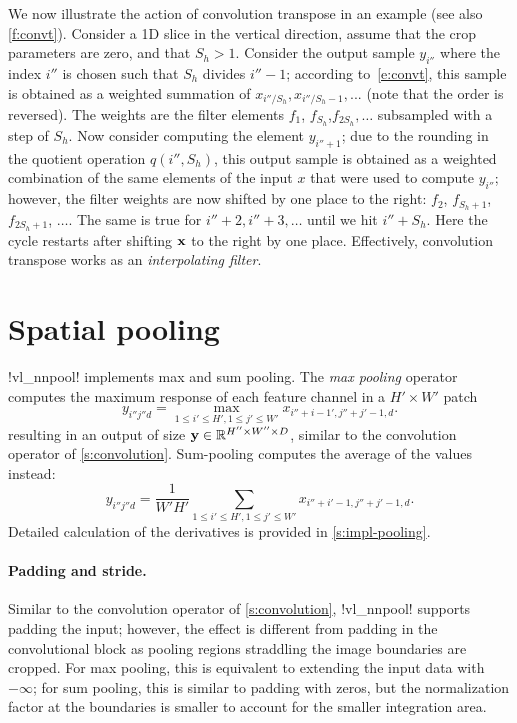 We now illustrate the action of convolution transpose in an example (see also \cref{f:convt}).  Consider a 1D slice in the vertical direction, assume that the crop parameters are zero, and that $S_h>1$. Consider the output sample $y_{i''}$ where the index $i''$ is chosen such that $S_h$ divides $i''-1$; according to~\eqref{e:convt}, this sample is obtained as a weighted summation of $x_{i'' / S_h},x_{i''/S_h-1},...$ (note that the order is reversed). The weights are the filter elements $f_1$, $f_{S_h}$,$f_{2S_h},\dots$ subsampled with a step of $S_h$. Now consider computing the element $y_{i''+1}$; due to the rounding in the quotient operation $q(i'',S_h)$, this output sample is obtained as a weighted combination of the same elements of the input $x$ that were used to compute $y_{i''}$; however, the filter weights are now shifted by one place to the right: $f_2$, $f_{S_h+1}$,$f_{2S_h+1}$, $\dots$. The same is true for $i''+2, i'' + 3,\dots$ until we hit $i'' + S_h$. Here the cycle restarts after shifting $\mathbf{x}$ to the right by one place. Effectively, convolution transpose works as an \emph{interpolating filter}.

\section{Spatial pooling}\label{s:pooling}

!vl_nnpool! implements max and sum pooling. The \emph{max pooling} operator computes the maximum response of each feature channel in a $H' \times W'$ patch
\[
y_{i''j''d} = \max_{1\leq i' \leq H', 1 \leq j' \leq W'} x_{i''+i-1',j''+j'-1,d}.
\]
resulting in an output of size $\mathbf{y}\in\mathbb{R}^{H''\times W'' \times D}$, similar to the convolution operator of \cref{s:convolution}. Sum-pooling computes the average of the values instead:
\[
y_{i''j''d} = \frac{1}{W'H'}
\sum_{1\leq i' \leq H', 1 \leq j' \leq W'} x_{i''+i'-1,j''+j'-1,d}.
\]
Detailed calculation of the derivatives is provided in \cref{s:impl-pooling}.

\paragraph{Padding and stride.} Similar to the convolution operator of \cref{s:convolution}, !vl_nnpool! supports padding the input; however, the effect is different from padding in the convolutional block as pooling regions straddling the image boundaries are cropped. For max pooling, this is equivalent to extending the input data with $-\infty$; for sum pooling, this is similar to padding with zeros, but the normalization factor at the boundaries is smaller to account for the smaller integration area.


